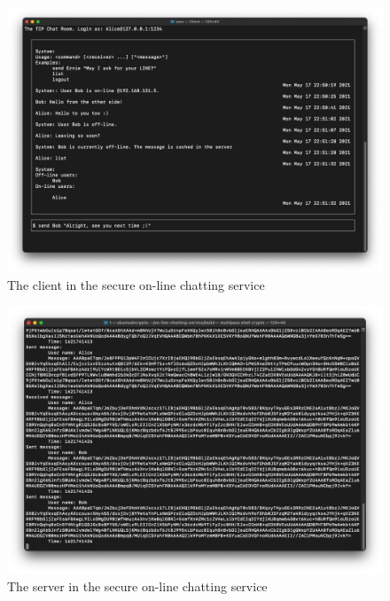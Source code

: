 \documentclass[12pt]{article}
\begin{document}
\begin{figure}
\begin{center}
    \includegraphics[width=1.0\textwidth]{assets/figures/client}
\end{center}
\caption{The client in the secure on-line chatting service}
\label{fig:client}
\end{figure}

\begin{figure}
\begin{center}
    \includegraphics[width=1.0\textwidth]{assets/figures/server}
\end{center}
\caption{The server in the secure on-line chatting service}
\label{fig:server}
\end{figure}

\newpage

\end{document}
